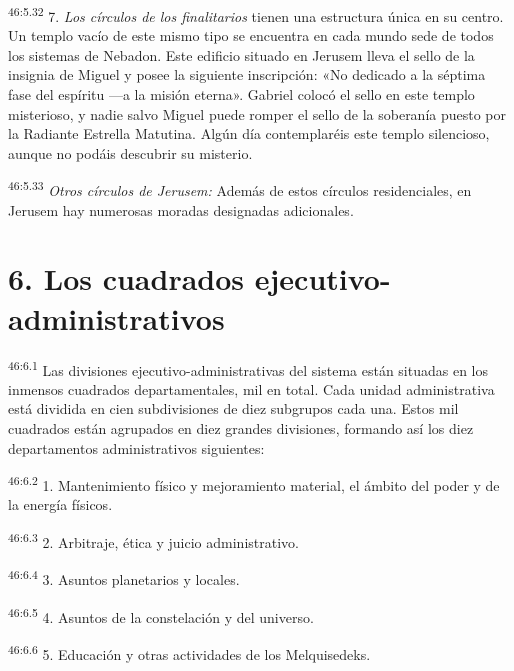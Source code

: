 \par
\textsuperscript{46:5.32} 7. \textit{Los círculos de los finalitarios} tienen una estructura única en su centro. Un templo vacío de este mismo tipo se encuentra en cada mundo sede de todos los sistemas de Nebadon. Este edificio situado en Jerusem lleva el sello de la insignia de Miguel y posee la siguiente inscripción: «No dedicado a la séptima fase del espíritu ---a la misión eterna». Gabriel colocó el sello en este templo misterioso, y nadie salvo Miguel puede romper el sello de la soberanía puesto por la Radiante Estrella Matutina. Algún día contemplaréis este templo silencioso, aunque no podáis descubrir su misterio.

\par
\textsuperscript{46:5.33} \textit{Otros círculos de Jerusem:} Además de estos círculos residenciales, en Jerusem hay numerosas moradas designadas adicionales.

\section*{6. Los cuadrados ejecutivo-administrativos}
\par
\textsuperscript{46:6.1} Las divisiones ejecutivo-administrativas del sistema están situadas en los inmensos cuadrados departamentales, mil en total. Cada unidad administrativa está dividida en cien subdivisiones de diez subgrupos cada una. Estos mil cuadrados están agrupados en diez grandes divisiones, formando así los diez departamentos administrativos siguientes:

\par
\textsuperscript{46:6.2} 1. Mantenimiento físico y mejoramiento material, el ámbito del poder y de la energía físicos.

\par
\textsuperscript{46:6.3} 2. Arbitraje, ética y juicio administrativo.

\par
\textsuperscript{46:6.4} 3. Asuntos planetarios y locales.

\par
\textsuperscript{46:6.5} 4. Asuntos de la constelación y del universo.

\par
\textsuperscript{46:6.6} 5. Educación y otras actividades de los Melquisedeks.

